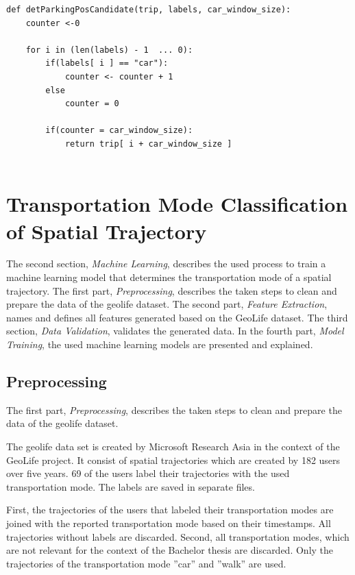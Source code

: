 \begin{lstlisting}[style=py, caption={Pseudocode: Determine Parking Position Candidate}, label={code:ParkCandidate}]
def detParkingPosCandidate(trip, labels, car_window_size):
    counter <-0
    
    for i in (len(labels) - 1  ... 0):
        if(labels[ i ] == "car"):
            counter <- counter + 1
        else
            counter = 0
        
        if(counter = car_window_size):
            return trip[ i + car_window_size ]
   
\end{lstlisting}

\section{Transportation Mode Classification of Spatial Trajectory}
The second section, \textit{Machine Learning}, describes the used process to train a machine learning model that determines the transportation mode of a spatial trajectory.
The first part, \textit{Preprocessing}, describes the taken steps to clean and prepare the data of the geolife dataset.
The second part, \textit{Feature Extraction}, names and defines all features generated based on the GeoLife dataset.
The third section, \textit{Data Validation}, validates the generated data.
In the fourth part, \textit{Model Training}, the used machine learning models are presented and explained. 

\subsection{Preprocessing}
The first part, \textit{Preprocessing}, describes the taken steps to clean and prepare the data of the geolife dataset.

The geolife data set is created by Microsoft Research Asia in the context of the GeoLife project. It consist of spatial trajectories which are created by 182 users over five years. 69 of the users label their trajectories with the used transportation mode. The labels are saved in separate files. \cite{zheng2008understanding} \cite{zheng2010geolife} \cite{geolife-dataset} \cite{zheng2009mining}

First, the trajectories of the users that labeled their transportation modes are joined with the reported transportation mode based on their timestamps. All trajectories without labels are discarded. Second, all transportation modes, which are not relevant for the context of the Bachelor thesis are discarded. Only the trajectories of the transportation mode ''car'' and ''walk'' are used.

